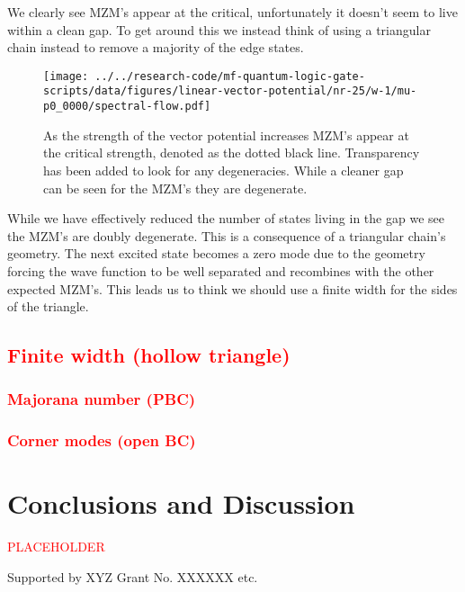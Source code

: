 \documentclass[aps,prb,showpacs,twocolumn,amsmath,amssymb,superscriptaddress]{revtex4-2}
\newcommand{\Red}[1]{\textcolor{red}{#1}}
\begin{document}
We clearly see MZM's appear at the critical, unfortunately it doesn't seem to live within a clean gap.
To get around this we instead think of using a triangular chain instead to remove a majority of the edge states.

\begin{figure}[h]
\texttt{[image: ../../research-code/mf-quantum-logic-gate-scripts/data/figures/linear-vector-potential/nr-25/w-1/mu-p0\_0000/spectral-flow.pdf]}
\label{fig: full-triangle-spectral}
\caption{As the strength of the vector potential increases MZM's appear at the critical strength, denoted as the dotted black line. Transparency has been added to look for any degeneracies. While a cleaner gap can be seen for the MZM's they are degenerate.}
\end{figure}
While we have effectively reduced the number of states living in the gap we see the MZM's are doubly degenerate.
This is a consequence of a triangular chain's geometry.
The next excited state becomes a zero mode due to the geometry forcing the wave function to be well separated and recombines with the other expected MZM's.
This leads us to think we should use a finite width for the sides of the triangle.

\subsection{\Red{Finite width (hollow triangle)}}

\subsubsection{\Red{Majorana number (PBC)}}

\subsubsection{\Red{Corner modes (open BC)}}

\section{Conclusions and Discussion}

\Red{PLACEHOLDER}


\begin{acknowledgements}
  Supported by XYZ Grant No. XXXXXX etc.
\end{acknowledgements}


%
\end{document}
